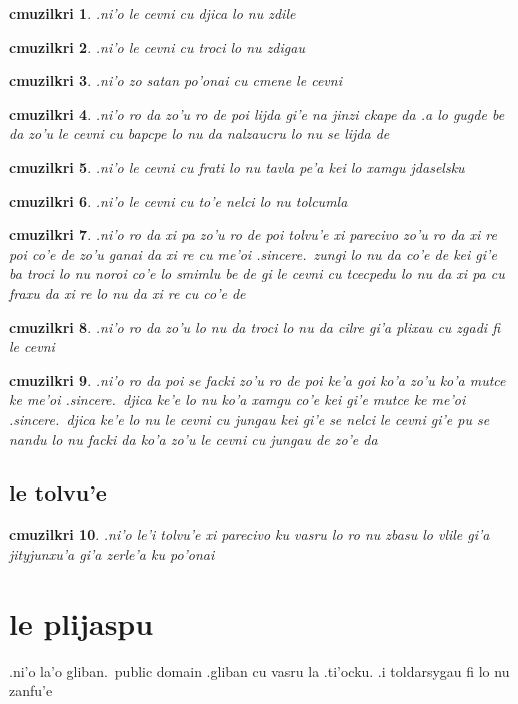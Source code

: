 \documentclass{report}
\newtheorem{cmuzilkri}{cmuzilkri}
\begin{document}
\begin{cmuzilkri}
        .ni'o le cevni cu djica lo nu zdile
\end{cmuzilkri}
\begin{cmuzilkri}
        .ni'o le cevni cu troci lo nu zdigau
\end{cmuzilkri}
\begin{cmuzilkri}
        .ni'o zo satan po'onai cu cmene le cevni
\end{cmuzilkri}
\begin{cmuzilkri}
        .ni'o ro da zo'u ro de poi lijda gi'e na jinzi ckape da .a lo gugde be da zo'u le cevni cu bapcpe lo nu da nalzaucru lo nu se lijda de
\end{cmuzilkri}
\begin{cmuzilkri}
        .ni'o le cevni cu frati lo nu tavla pe'a kei lo xamgu jdaselsku
\end{cmuzilkri}
\begin{cmuzilkri}
        .ni'o le cevni cu to'e nelci lo nu tolcumla
\end{cmuzilkri}
\begin{cmuzilkri}
        .ni'o ro da xi pa zo'u ro de poi tolvu'e xi parecivo zo'u ro da xi re poi co'e de zo'u ganai da xi re cu me'oi .sincere.\ zungi lo nu da co'e de kei gi'e ba troci lo nu noroi co'e lo smimlu be de gi le cevni cu tcecpedu lo nu da xi pa cu fraxu da xi re lo nu da xi re cu co'e de
\end{cmuzilkri}
\begin{cmuzilkri}
        .ni'o ro da zo'u lo nu da troci lo nu da cilre gi'a plixau cu zgadi fi le cevni
\end{cmuzilkri}
\begin{cmuzilkri}
        .ni'o ro da poi se facki zo'u ro de poi ke'a goi ko'a zo'u ko'a mutce ke me'oi .sincere.\ djica ke'e lo nu ko'a xamgu co'e kei gi'e mutce ke me'oi .sincere.\ djica ke'e lo nu le cevni cu jungau kei gi'e se nelci le cevni gi'e pu se nandu lo nu facki da ko'a zo'u le cevni cu jungau de zo'e da
\end{cmuzilkri}

\section{le tolvu'e}
\begin{cmuzilkri}
        .ni'o le'i tolvu'e xi parecivo ku vasru lo ro nu zbasu lo vlile gi'a jityjunxu'a gi'a zerle'a ku po'onai
\end{cmuzilkri}

\chapter{le plijaspu}
.ni'o la'o gliban.\ public domain .gliban cu vasru la .ti'ocku.  .i toldarsygau fi lo nu zanfu'e
\end{document}
